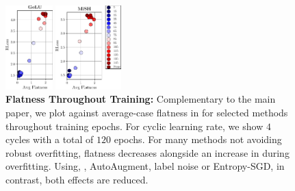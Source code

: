 \begin{figure}
\begin{minipage}[t]{0.11\textwidth}
	\end{minipage}
	\begin{minipage}[t]{0.11\textwidth}
		\includegraphics[height=3.25cm]{plots_supp_flatness_epochs_correlation_joint_gelu}
	\end{minipage}
	\begin{minipage}[t]{0.14\textwidth}
		\includegraphics[height=3.25cm]{plots_supp_flatness_epochs_correlation_joint_mish}
	\end{minipage}
	\vspace*{-6px}
	\caption{\textbf{Flatness Throughout Training:} Complementary to the main paper, we plot \RCE against average-case flatness in \RCE for selected methods throughout training epochs.  For cyclic learning rate, we show $4$ cycles with a total of $120$ epochs. For many methods not avoiding robust overfitting, flatness decreases alongside an increase in \RCE during overfitting. Using, \eg, AutoAugment, label noise or Entropy-SGD, in contrast, both effects are reduced.}
	\label{fig:supp-methods-flatness-epochs}
	\vspace*{-6px}
\end{figure}

